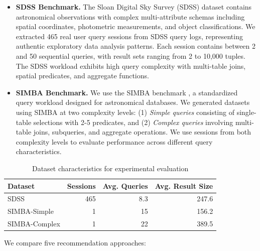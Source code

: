 \documentclass[sigconf, nonacm]{acmart}
\begin{document}
\begin{itemize}
  \item \textbf{SDSS Benchmark.} The Sloan Digital Sky Survey (SDSS) dataset \cite{york_sloan_2000}  contains astronomical observations with complex multi-attribute schemas including spatial coordinates, photometric measurements, and object classifications. We extracted 465 real user query sessions from SDSS query logs, representing authentic exploratory data analysis patterns. Each session contains between 2 and 50 sequential queries, with result sets ranging from 2 to 10,000 tuples. The SDSS workload exhibits high query complexity with multi-table joins, spatial predicates, and aggregate functions.
  \item \textbf{SIMBA Benchmark.} We use the SIMBA benchmark \cite{lenzi2019simba}, a standardized query workload designed for astronomical databases. We generated datasets using SIMBA at two complexity levels: (1) \textit{Simple queries} consisting of single-table selections with 2-5 predicates, and (2) \textit{Complex queries} involving multi-table joins, subqueries, and aggregate operations. We use sessions from both complexity levels to evaluate performance across different query characteristics.
\end{itemize}
\begin{table}[t]
\centering
\caption{Dataset characteristics for experimental evaluation}
\label{tab:datasets}
\begin{tabular}{lrrr}
\toprule
\textbf{Dataset} & \textbf{Sessions} & \textbf{Avg. Queries} & \textbf{Avg. Result Size} \\
\midrule
SDSS & 465 & 8.3 & 247.6 \\
SIMBA-Simple & 1 & 15 & 156.2 \\
SIMBA-Complex & 1 & 22 & 389.5 \\
\bottomrule
\end{tabular}
\end{table}

We compare five recommendation approaches:
\end{document}
